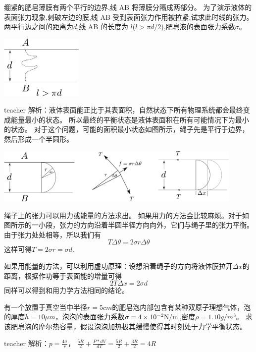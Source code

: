 \begin{example}
绷紧的肥皂薄膜有两个平行的边界,线 AB 将薄膜分隔成两部分。
为了演示液体的表面张力现象,刺破左边的膜,线 AB 受到表面张力作用被拉紧,试求此时线的张力。
两平行边之间的距离为$d$,线 AB 的长度为 $l$($l> \pi d/2$),肥皂液的表面张力系数$\sigma$。
\begin{flushright}
\includegraphics[width=0.3\textwidth]{images/mebrane-1.pdf}
\end{flushright}

\begin{taggedblock}{teacher}
\noindent
解析：液体表面能正比于其表面积，自然状态下所有物理系统都会最终变成能量最小的状态。
所以最终的平衡状态是液体表面积在所有可能情况下为最小的状态。
对于这个问题，可能的面积最小状态如图所示，绳子先是平行于边界，然后形成一个半圆形。


\includegraphics[width=0.9\textwidth]{images/mebrane-2.pdf}

绳子上的张力可以用力或能量的方法求出。
如果用力的方法会比较麻烦。对于如图所示的一小段，张力的方向沿着半圆半径方向向外，它们与绳子里的张力平衡。
由于张力处处相等，所以我们有
\[
T\Delta \theta = 2\sigma r \Delta \theta
\]
这样可得$T = 2\sigma r = \sigma d.$

如果用能量的方法，可以利用虚功原理：设想沿着绳子的方向将液体膜拉开$\Delta x$的距离，根据作功等于表面能的增量可得
\[ 2T\Delta x = 2\sigma d\]
同样可以得到和用力学方法相同的结论。
\end{taggedblock}
\end{example}

\begin{example}
有一个放置于真空当中半径$r=5\unit{cm}$的肥皂泡内部包含有某种双原子理想气体，泡的厚度$h=10\unit{\mu m}$，泡泡的表面张力系数$\sigma=4\times 10^{-2}{\rm{N/m}}$,密度$\rho = 1.10 \unit{g/m^3}$。
求该肥皂泡的摩尔热容量，假设泡泡加热极其缓慢使得其时刻处于力学平衡状态。
\begin{taggedblock}{teacher}
\newline
解析：$p=\frac{4\sigma}{r}$，    $\frac{5R}{2}+\frac{P*dV}{dT}=\frac{5R}{2}+\frac{3R}{2}=4R$
\end{taggedblock}
\end{example}

